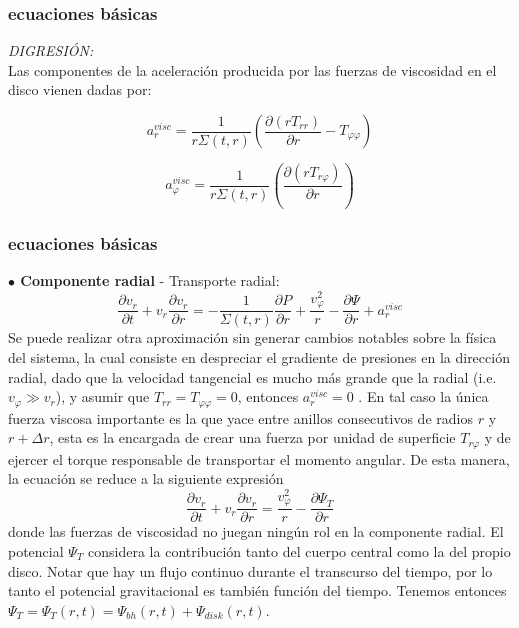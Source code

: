 \documentclass{beamer}
\begin{document}
\begin{frame}
\frametitle{ecuaciones básicas}
 \textit{DIGRESIÓN:}\\
 \vspace*{0.8cm}
Las componentes de la aceleración producida por las fuerzas
de viscosidad en el disco vienen dadas por:

\begin{equation}
 a_{r}^{visc} = \frac{1}{r\Sigma(t,r)} \left( \frac{\partial (rT_{rr})}{\partial r} - T_{\varphi \varphi} \right) 
\end{equation}

\begin{equation}
 a_{\varphi}^{visc} = \frac{1}{r\Sigma(t,r)} \left( \frac{\partial (rT_{r\varphi})}{\partial r} \right)
\end{equation}

\end{frame}




\begin{frame}
\frametitle{ecuaciones básicas}
\justify
\scriptsize
\vspace*{-0.4cm}
\textbf{$\bullet$ Componente radial} - Transporte radial:
\begin{equation}\label{eq:transporteradial}
\frac{\partial v_{r}}{\partial t} +v_{r}\frac{\partial v_{r}}{\partial r} =
- \frac{1}{\Sigma(t,r)}\frac{\partial P}{\partial r} + \frac{v_{\varphi}^{2}}{r} - \frac{\partial \Psi}{\partial r} + a_r^{visc}
\end{equation}
Se puede realizar otra aproximación sin generar cambios notables sobre la física del sistema,
la cual consiste en despreciar el gradiente de presiones en la dirección radial, dado que la velocidad 
tangencial es mucho más grande que la radial (i.e. $ v_{\varphi} \gg v_{r} $), y asumir que $T_{rr}=T_{\varphi\varphi}=0$,
entonces $a_r^{visc}=0$ . En tal caso
la única fuerza viscosa importante es la que yace entre anillos consecutivos de radios
$r$ y $r+\Delta r$, esta es la encargada de crear una fuerza por unidad de superficie $T_{r\varphi}$
y de ejercer el torque responsable de transportar el momento angular. De esta manera, la
ecuación \label{eq:transporteradial} se reduce a la siguiente expresión
\begin{equation}\label{eq:transporteradialsimple}
\frac{\partial v_{r}}{\partial t} +v_{r}\frac{\partial v_{r}}{\partial r} =
\frac{v_{\varphi}^{2}}{r} - \frac{\partial \Psi_{T}}{\partial r}
\end{equation}
donde las fuerzas de viscosidad no juegan ningún rol en la componente radial.
El potencial $\Psi_{T}$ considera la contribución tanto del cuerpo central
como la del propio disco. Notar que hay un flujo continuo durante el transcurso del tiempo,
por lo tanto el potencial gravitacional es también función del tiempo.
Tenemos entonces $\Psi_T = \Psi_T(r,t)=\Psi_{bh}(r,t) +\Psi_{disk}(r,t)$.\\
\end{frame}
\end{document}
